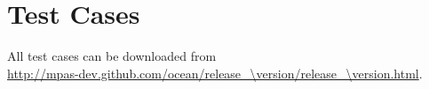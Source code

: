 \chapter{Test Cases}
\label{chap:ocean_test_cases}

All test cases can be downloaded from \\
\url{http://mpas-dev.github.com/ocean/release_\version/release_\version.html}.

\FloatBarrier

\FloatBarrier

\FloatBarrier

\FloatBarrier

